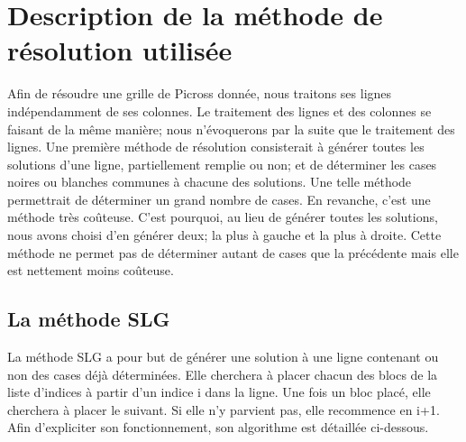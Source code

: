 \documentclass{article}
\begin{document}
\section{Description de la m\'ethode de r\'esolution utilis\'ee}
Afin de r\'esoudre une grille de Picross donn\'ee, nous traitons ses lignes ind\'ependamment de ses colonnes. 
Le traitement des lignes et des colonnes se faisant de la m\^eme mani\`ere; nous n'\'evoquerons par la suite que le traitement des lignes.
\newline
Une premi\`ere m\'ethode de r\'esolution consisterait \`a g\'en\'erer toutes les solutions d'une ligne, partiellement remplie ou non; et de d\'eterminer les cases noires ou blanches communes \`a chacune des solutions.
\newline
Une telle m\'ethode permettrait de d\'eterminer un grand nombre de cases. En revanche, c'est une m\'ethode tr\`es co\^uteuse.
\newline
C'est pourquoi, au lieu de g\'en\'erer toutes les solutions, nous avons choisi d'en g\'en\'erer deux; la plus \`a gauche et la plus \`a droite. Cette m\'ethode ne permet pas de d\'eterminer autant de cases que la pr\'ec\'edente mais elle est nettement moins co\^uteuse.
\subsection{La m\'ethode SLG}
La m\'ethode SLG a pour but de g\'en\'erer une solution \`a une ligne contenant ou non des cases d\'ej\`a d\'etermin\'ees.
Elle cherchera \`a placer chacun des blocs de la liste d'indices \`a partir d'un indice i dans la ligne.
Une fois un bloc plac\'e, elle cherchera \`a placer le suivant. Si elle n'y parvient pas, elle recommence en i+1.
Afin d'expliciter son fonctionnement, son algorithme est d\'etaill\'ee ci-dessous.
\end{document}
